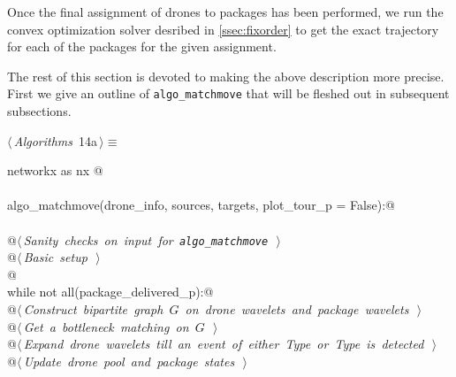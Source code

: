 \documentclass[10pt, english, oneside]{report}
\begin{document}
Once the final assignment of drones to packages has been performed, 
we run the convex optimization solver desribed in \autoref{ssec:fixorder}
to get the exact trajectory for each of the packages for the given assignment.

The rest of this section is devoted to making the above description 
more precise. First we give an outline of  \verb|algo_matchmove| that will be 
fleshed out in subsequent subsections. 

\begin{flushleft} \small
\begin{minipage}{\linewidth}\label{scrap13}\raggedright\small
{} $\langle\,${\itshape Algorithms}\nobreak\ {\footnotesize {14a}}$\,\rangle\equiv$
\vspace{-1ex}
\begin{list}{}{} \item
\mbox{}\verb@import networkx as nx @\\
\mbox{}\verb@@\\
\mbox{}\verb@def algo_matchmove(drone_info, sources, targets, plot_tour_p = False):@\\
\mbox{}\verb@@\\
\mbox{}\verb@     @\hbox{$\langle\,${\itshape Sanity checks on input for \verb|algo_matchmove|}\nobreak\ {\footnotesize {}}$\,\rangle$}\verb@@\\
\mbox{}\verb@     @\hbox{$\langle\,${\itshape Basic setup}\nobreak\ {\footnotesize {}}$\,\rangle$}\verb@@\\
\mbox{}\verb@    @\\
\mbox{}\verb@     while not all(package_delivered_p):@\\
\mbox{}\verb@          @\hbox{$\langle\,${\itshape Construct bipartite graph $G$ on drone wavelets and package wavelets}\nobreak\ {\footnotesize {}}$\,\rangle$}\verb@@\\
\mbox{}\verb@          @\hbox{$\langle\,${\itshape Get a bottleneck matching on $G$}\nobreak\ {\footnotesize {}}$\,\rangle$}\verb@@\\
\mbox{}\verb@          @\hbox{$\langle\,${\itshape Expand drone wavelets till an event of either Type  or Type  is detected}\nobreak\ {\footnotesize {}}$\,\rangle$}\verb@@\\
\mbox{}\verb@          @\hbox{$\langle\,${\itshape Update drone pool and package states}\nobreak\ {\footnotesize {}}$\,\rangle$}\verb@@\\

\end{list}
\end{minipage}
\end{flushleft}
\end{document}
